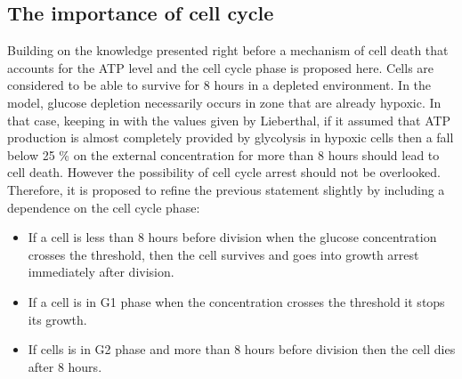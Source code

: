 \documentclass[11pt,a4paper]{article}
\begin{document}
\subsection{The importance of cell cycle}
Building on the knowledge presented right before a mechanism of cell death that accounts for the ATP level and the cell cycle phase is proposed here. Cells are considered to be able to survive for 8 hours in a depleted environment. In the model, glucose depletion necessarily occurs in zone that are already hypoxic. In that case, keeping in with the values given by Lieberthal, if it assumed that ATP production is almost completely provided by glycolysis in hypoxic cells then a fall below 25 \% on the external concentration for more than 8 hours should lead to cell death. However the possibility of cell cycle arrest should not be overlooked. Therefore, it is proposed to refine the previous statement slightly by including a dependence on the cell cycle phase: 
\begin{itemize}
\item If a cell is less than 8 hours before division when the glucose concentration crosses the threshold, then the cell survives and goes into growth arrest immediately after division. 
\item If a cell is in G1 phase when the concentration crosses the threshold it stops its growth.
\item If cells is in G2 phase and more than 8 hours before division then the cell dies after 8 hours.
\end{itemize} 
\end{document}
